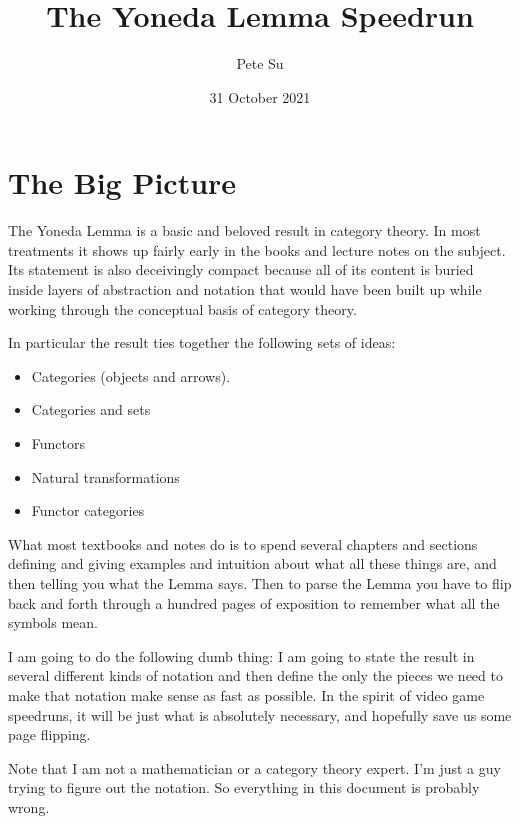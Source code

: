 \documentclass[12pt]{article}
\begin{document}
\title{\Large The Yoneda Lemma Speedrun}
\author{\large Pete Su}
\date{\large 31 October 2021}

\maketitle

\section{The Big Picture}

The Yoneda Lemma is a basic and beloved result in category theory. In most treatments it
shows up fairly early in the books and lecture notes on the subject. Its
statement is also deceivingly compact because all of its content is buried inside layers
of abstraction and notation that would have been built up while working through the
conceptual basis of category theory.

In particular the result ties together the following sets of ideas:

\begin{itemize}

\item Categories (objects and arrows).
\item Categories and sets
\item Functors
\item Natural transformations
\item Functor categories

\end{itemize}

\noindent
What most textbooks and notes do is to spend several chapters and sections defining and
giving examples and intuition about what all these things are, and then telling you what
the Lemma says. Then to parse the Lemma you have to flip back and forth through a hundred 
pages of exposition to remember what all the symbols mean.

I am going to do the following dumb thing: I am going to state the result in several
different kinds of notation and then define the only the pieces we need to make that notation make sense as fast as possible.
In the spirit of video game speedruns, it will be just what is absolutely necessary, and hopefully save us some page flipping.

Note that I am not a mathematician or a category theory expert. I'm just a guy trying to
figure out the notation. So everything in this document is probably wrong.
\end{document}
